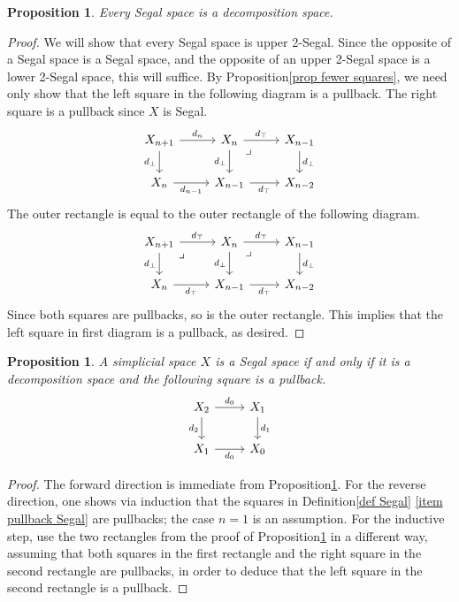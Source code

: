 \documentclass{amsart}
\newtheorem{proposition}[theorem]{Proposition}
\theoremstyle{definition}
\theoremstyle{remark}
\begin{document}
\begin{proposition}\label{segal implies decomposition}
Every Segal space is a decomposition space.
\end{proposition}
\begin{proof}
We will show that every Segal space is upper 2-Segal.
Since the opposite of a Segal space is a Segal space, and the opposite of an upper 2-Segal space is a lower 2-Segal space, this will suffice.
By Proposition\nobreakspace \ref {prop fewer squares}, we need only show that the left square in the following diagram is a pullback.
The right square is a pullback since $X$ is Segal.
\[ \begin{tikzcd}
X_{n+1} \rar{d_n} \dar[swap]{d_\bot} &
X_n \rar{d_\top} \dar[swap]{d_\bot} \ar[dr, phantom, "\lrcorner" very near start] & X_{n-1} \dar{d_\bot}
\\
X_n \rar[swap]{d_{n-1}} & 
X_{n-1} \rar[swap]{d_\top} & X_{n-2}
\end{tikzcd} \]
The outer rectangle is equal to the outer rectangle of the following diagram.
\[ \begin{tikzcd}
X_{n+1} \rar{d_\top} \dar[swap]{d_\bot} \ar[dr, phantom, "\lrcorner" very near start] &
X_n \rar{d_\top} \dar[swap]{d_\bot} \ar[dr, phantom, "\lrcorner" very near start] & X_{n-1} \dar{d_\bot}
\\
X_n \rar[swap]{d_\top} & 
X_{n-1} \rar[swap]{d_\top} & X_{n-2}
\end{tikzcd} \]
Since both squares are pullbacks, so is the outer rectangle.
This implies that the left square in first diagram is a pullback, as desired.
\end{proof}

\begin{proposition}
A simplicial space $X$ is a Segal space if and only if it is a decomposition space and the following square is a pullback.
\[ \begin{tikzcd}
X_2 \rar{d_0} \dar[swap]{d_2} & X_1 \dar{d_1} \\
X_1 \rar[swap]{d_0} & X_0
\end{tikzcd} \]
\end{proposition}
\begin{proof}
The forward direction is immediate from Proposition\nobreakspace \ref {segal implies decomposition}.
For the reverse direction, one shows via induction that the squares in Definition\nobreakspace \ref {def Segal} \eqref{item pullback Segal} are pullbacks; the case $n=1$ is an assumption.
For the inductive step, use the two rectangles from the proof of Proposition\nobreakspace \ref {segal implies decomposition} in a different way, assuming that both squares in the first rectangle and the right square in the second rectangle are pullbacks, in order to deduce that the left square in the second rectangle is a pullback.
\end{proof}
\end{document}
